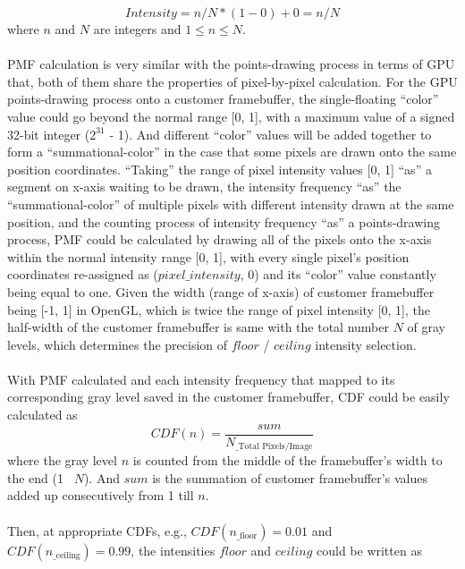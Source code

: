 \begin{equation}
%
Intensity = n/N * (1 - 0) + 0 = n/N
%
\end{equation}%
%
where \(n\) and \(N\) are integers and \(1 \leqslant n \leqslant N\).\\\\%
%
PMF calculation is very similar with the points-drawing process in terms of GPU that, both of them share the properties of pixel-by-pixel calculation. For the GPU points-drawing process onto a customer framebuffer, the single-floating \enquote{color} value could go beyond the normal range [0, 1], with a maximum value of a signed 32-bit integer (\(2^{31}\) - 1). And different \enquote{color} values will be added together to form a \enquote{summational-color} in the case that some pixels are drawn onto the same position coordinates. \enquote{Taking} the range of pixel intensity values [0, 1] \enquote{as} a segment on x-axis waiting to be drawn, the intensity frequency \enquote{as} the \enquote{summational-color} of multiple pixels with different intensity drawn at the same position, and the counting process of intensity frequency \enquote{as} a points-drawing process, PMF could be calculated by drawing all of the pixels onto the x-axis within the normal intensity range [0, 1], with every single pixel's position coordinates re-assigned as (\(pixel\_intensity\), \(0\)) and its \enquote{color} value constantly being equal to one. Given the width (range of x-axis) of customer framebuffer being [-1, 1] in OpenGL, which is twice the range of pixel intensity [0, 1], the half-width of the customer framebuffer is same with the total number \(N\) of gray levels, which determines the precision of \(floor\) / \(ceiling\) intensity selection. 
\\\\%
With PMF calculated and each intensity frequency that mapped to its corresponding gray level saved in the customer framebuffer, CDF could be easily calculated as
%
\begin{equation}
%
CDF(n) = \frac{sum}{N_{\text{\_Total Pixels/Image}}} 
%
\end{equation}%
%
where the gray level \(n\) is counted from the middle of the framebuffer's width to the end (1 \texttildelow \, \(N\)). And \(sum\) is the summation of customer framebuffer's values added up consecutively from 1 till \(n\).\\\\%
%
Then, at appropriate CDFs, e.g., \(CDF(n_{\text{\_floor}}) = 0.01\) and \(CDF(n_{\text{\_ceiling}}) = 0.99\), the intensities \(floor\) and \(ceiling\) could be written as
